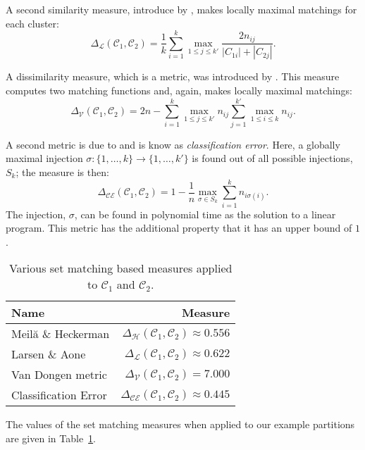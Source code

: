 \documentclass[a4paper]{report}
\newcommand{\clus}{\mathcal{C}}
\newcommand{\partcompare}[1]{\Delta_{\mathcal{#1}}(\clus_1,\clus_2)}
\begin{document}
A second similarity measure, introduce by \citet{larsen-aone-1999}, makes
locally maximal matchings for each cluster:
\begin{equation*}
  \partcompare{L} = \frac{1}{k} \sum_{i=1}^{k} \max_{1 \leq j \leq k'}
                                             \frac{2n_{ij}}{|C_{1i}|+|C_{2j}|}.
\end{equation*}

A dissimilarity measure, which is a metric, was introduced by
\citet{van-dongen-2000}.  This measure computes two matching functions and,
again, makes locally maximal matchings:
\begin{equation*}
  \partcompare{V} = 2n - \sum_{i=1}^{k} \max_{1 \leq j \leq k'} n_{ij}
                         \sum_{j=1}^{k'} \max_{1 \leq i \leq k} n_{ij}.
\end{equation*}

A second metric is due to \citet{meila-2005} and is know as
\textit{classification error}.  Here, a globally maximal injection $\sigma
\colon \{1,\dotsc,k\} \to \{1,\dotsc,k'\}$ is found out of all possible
injections, $S_k$; the measure is then:
\begin{equation*}
  \partcompare{CE} = 1 - \frac{1}{n} \max_{\sigma \in S_k}
                                     \sum_{i=1}^{k} n_{i \sigma(i)}.
\end{equation*}
The injection, $\sigma$, can be found in polynomial time as the solution to a
linear program.  This metric has the additional property that it has an upper
bound of $1$.

\begin{table}
  \centering
  \begin{tabular}{lr}
    \toprule
    Name & Measure \\
    \midrule
    Meilă \& Heckerman   & $\partcompare{H} \approx 0.556$ \\
    Larsen \& Aone       & $\partcompare{L} \approx 0.622$ \\
    Van Dongen metric    & $\partcompare{V} = 7.000$ \\
    Classification Error & $\partcompare{CE} \approx 0.445$ \\
    
    \bottomrule
  \end{tabular}
  \caption{Various set matching based measures applied to $\clus_1$ and $\clus_2$.}
  \label{tab:set-matching-comparison}
\end{table}

The values of the set matching measures when applied to our example partitions
are given in Table~\ref{tab:set-matching-comparison}.
\end{document}
